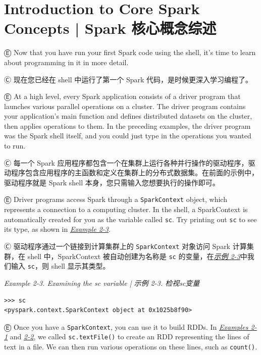 \section{Introduction to Core Spark Concepts  |  Spark 核心概念综述}\label{introduction-to-core-spark-concepts-}

Ⓔ \textcolor{etc}{Now that you have run your first Spark code using the shell, it's time to learn about programming in it in more detail.}

Ⓒ 现在您已经在 shell 中运行了第一个 Spark 代码，是时候更深入学习编程了。

Ⓔ \textcolor{etc}{At a high level, every Spark application consists of a driver program that launches various parallel operations on a cluster. The driver program contains your application's main function and defines distributed datasets on the cluster, then applies operations to them. In the preceding examples, the driver program was the Spark shell itself, and you could just type in the operations you wanted to run.}

Ⓒ 每一个 Spark 应用程序都包含一个在集群上运行各种并行操作的驱动程序，驱动程序包含应用程序的主函数和定义在集群上的分布式数据集。在前面的示例中，驱动程序就是 Spark shell 本身，您只需输入您想要执行的操作即可。

Ⓔ \textcolor{etc}{ Driver programs access Spark through a \lstinline{SparkContext} object, which represents a connection to a computing cluster. In the shell, a SparkContext is automatically created for you as the variable called \lstinline{sc}. Try printing out \lstinline{sc} to see its type, as shown in \hyperref[exmp2-3]{\emph{Example 2-3}}.}

Ⓒ 驱动程序通过一个链接到计算集群上的 \lstinline{SparkContext} 对象访问
Spark 计算集群，在 shell 中，SparkContext 被自动创建为名称是 \lstinline{sc}
的变量，在\hyperref[exmp2-3]{\emph{示例 2-3}}中我们输入 \lstinline{sc}，则 shell 显示其类型。

\emph{Example 2-3. Examining the sc variable  |  示例 2-3. 检视sc变量} \label{exmp2-3}

\begin{lstlisting}
>>> sc
<pyspark.context.SparkContext object at 0x1025b8f90>
\end{lstlisting}

Ⓔ \textcolor{etc}{Once you have a \lstinline{SparkContext}, you can use it to build RDDs. In \hyperref[exmp2-1]{\emph{Examples 2-1}} and \hyperref[exmp2-1]{\emph{2-2}}, we called \lstinline{sc.textFile()} to create an RDD representing the lines of text in a file. We can then run various operations on these lines, such as \lstinline{count()}.}

